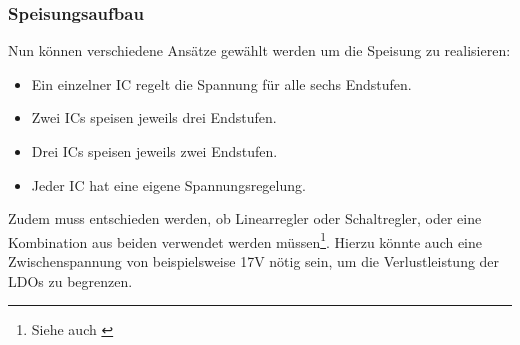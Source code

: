 \subsubsection{Speisungsaufbau}
Nun können verschiedene Ansätze gewählt werden um die Speisung zu realisieren:
\begin{itemize}
	\item Ein einzelner IC regelt die Spannung für alle sechs Endstufen.
	\item Zwei ICs speisen jeweils drei Endstufen.
	\item Drei ICs speisen jeweils zwei Endstufen.
	\item Jeder IC hat eine eigene Spannungsregelung.
\end{itemize}
Zudem muss entschieden werden, ob Linearregler oder Schaltregler, oder eine Kombination aus beiden verwendet werden müssen\footnote{Siehe auch \cite{switchingreg_linreg}}. Hierzu könnte auch eine Zwischenspannung von beispielsweise 17V nötig sein, um die Verlustleistung der LDOs zu begrenzen.
